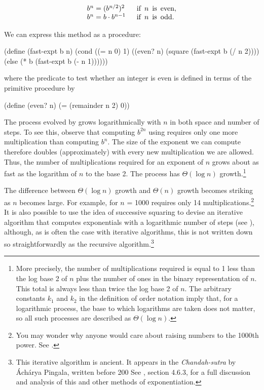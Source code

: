 $$
\begin{array}{l@{{}={}}lr@{\ n\ }l}
  b^n & (b^{n / 2})^2  \;\; & \mbox{if\,} & \mbox{\,is\, even}, \\
  b^n & b\cdot b^{n-1} \;\; & \mbox{if\,} & \mbox{\,is\, odd}.
\end{array}
$$

We can express this method as a procedure:

\begin{codeBlock}
(define (fast-expt b n)
  (cond ((= n 0) 1)
        ((even? n) (square (fast-expt b (/ n 2))))
        (else (* b (fast-expt b (- n 1))))))
\end{codeBlock}

\noindent
where the predicate to test whether an integer is even is defined in terms of
the primitive procedure  by

\begin{codeBlock}
(define (even? n)
  (= (remainder n 2) 0))
\end{codeBlock}

\noindent
The process evolved by  grows logarithmically with \( n \) in
both space and number of steps.  To see this, observe that computing
\( b^{2n} \) using  requires only one more multiplication
than computing \( b^n \).  The size of the exponent we can compute therefore
doubles (approximately) with every new multiplication we are allowed.  Thus,
the number of multiplications required for an exponent of \( n \) grows about as
fast as the logarithm of \( n \) to the base 2.  The process has
\( \Theta(\log n) \) growth.\footnote{More precisely, the number of
multiplications required is equal to 1 less than the log base 2 of \( n \) plus
the number of ones in the binary representation of \( n \).  This total is always
less than twice the log base 2 of \( n \).  The arbitrary constants \( k_1 \) and
\( k_2 \) in the definition of order notation imply that, for a logarithmic
process, the base to which logarithms are taken does not matter, so all such
processes are described as \( \Theta(\log n) \).}

The difference between \( \Theta(\log n) \) growth and
\( \Theta(n) \) growth becomes striking as \( n \) becomes large.  For
example,  for \( n \) = 1000 requires only 14
multiplications.\footnote{You may wonder why anyone would care about raising
numbers to the 1000th power.  See .} It is also possible to
use the idea of successive squaring to devise an iterative algorithm that
computes exponentials with a logarithmic number of steps (see ),
although, as is often the case with iterative algorithms, this is not
written down so straightforwardly as the recursive algorithm.\footnote{This
iterative algorithm is ancient.  It appears in the \textit{Chandah-sutra} by
\'Ach\'arya Pingala, written before 200  See , section
4.6.3, for a full discussion and analysis of this and other methods of
exponentiation.}

